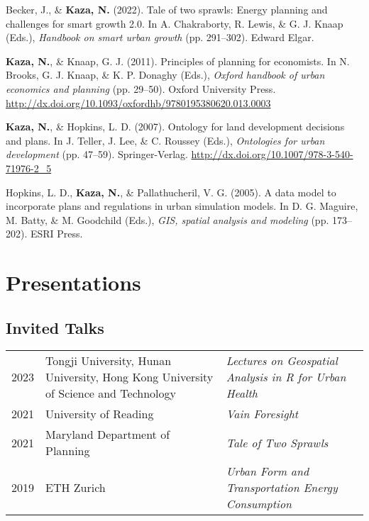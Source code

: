 \documentclass[11pt,a4paper,]{awesome-cv}
\newlength{\cslhangindent}
\newenvironment{CSLReferences}[2] %
 {\begin{list}{}{%
  \setlength{\itemindent}{0pt}
  \setlength{\leftmargin}{0pt}
  \setlength{\parsep}{0pt}
  \ifodd #1
   \setlength{\leftmargin}{\cslhangindent}
   \setlength{\itemindent}{-1\cslhangindent}
  \fi
  \setlength{\itemsep}{#2\baselineskip}}}
 {\end{list}}
\begin{document}
\label{refs-0041559440f226477f52e479a476acd4}
\begin{CSLReferences}{1}{0}
Becker, J., \& \textbf{Kaza, N.} (2022). Tale of two sprawls: Energy
planning and challenges for smart growth 2.0. In A. Chakraborty, R.
Lewis, \& G. J. Knaap (Eds.), \emph{Handbook on smart urban growth} (pp.
291--302). Edward Elgar.

\textbf{Kaza, N.}, \& Knaap, G. J. (2011). Principles of planning for
economists. In N. Brooks, G. J. Knaap, \& K. P. Donaghy (Eds.),
\emph{Oxford handbook of urban economics and planning} (pp. 29--50).
Oxford University Press.
\url{http://dx.doi.org/10.1093/oxfordhb/9780195380620.013.0003}

\textbf{Kaza, N.}, \& Hopkins, L. D. (2007). Ontology for land
development decisions and plans. In J. Teller, J. Lee, \& C. Roussey
(Eds.), \emph{Ontologies for urban development} (pp. 47--59).
Springer-Verlag. \url{http://dx.doi.org/10.1007/978-3-540-71976-2_5}

Hopkins, L. D., \textbf{Kaza, N.}, \& Pallathucheril, V. G. (2005). A
data model to incorporate plans and regulations in urban simulation
models. In D. G. Maguire, M. Batty, \& M. Goodchild (Eds.), \emph{GIS,
spatial analysis and modeling} (pp. 173--202). ESRI Press.

\end{CSLReferences}

\section{Presentations}\label{presentations}

\subsection{Invited Talks}\label{invited-talks}

\begin{tabular}{lp{6cm}l}
  2023 & Tongji University, Hunan University, Hong Kong University of Science and Technology & \emph{Lectures on Geospatial Analysis in R for Urban Health} \\ 
  2021 & University of Reading & \emph{Vain Foresight} \\ 
  2021 & Maryland Department of Planning & \emph{Tale of Two Sprawls} \\ 
  2019 & ETH Zurich & \emph{Urban Form and Transportation Energy Consumption} \\ 
  \end{tabular}
\end{document}
